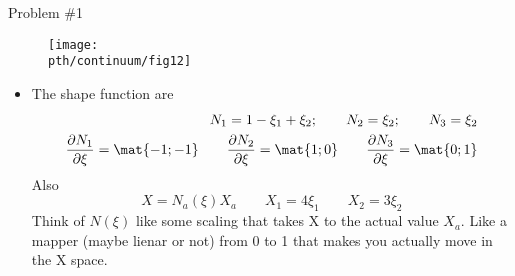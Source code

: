 	\begin{frame}{Problem \#1}
		\begin{figure}
			\centering
			\texttt{[image: \\pth/continuum/fig12]}
		\end{figure}
		\begin{itemize}
			\item The shape function are 
			\begin{equation}
				\begin{aligned}
				N_1 = 1 - \xi_1 + \xi_2;\qquad N_2 = \xi_2;\qquad N_3 = \xi_2 \\
				\frac{\partial N_1}{\partial \xi} = \mat{-1;-1} \qquad \frac{\partial N_2}{\partial \xi} = \mat{1;0} \qquad \frac{\partial N_3}{\partial \xi} = \mat{0;1} 
				\end{aligned}
			\end{equation}
			Also
			\begin{equation}
			X = N_a(\xi) X_a \qquad X_1 = 4\xi_1 \qquad X_2 = 3\xi_2
			\end{equation}
			Think of $N(\xi)$ like some scaling that takes X to the actual value $X_a$. Like a mapper (maybe lienar or not) from 0 to 1 that makes you actually move in the X space.
		\end{itemize}
	\end{frame}

